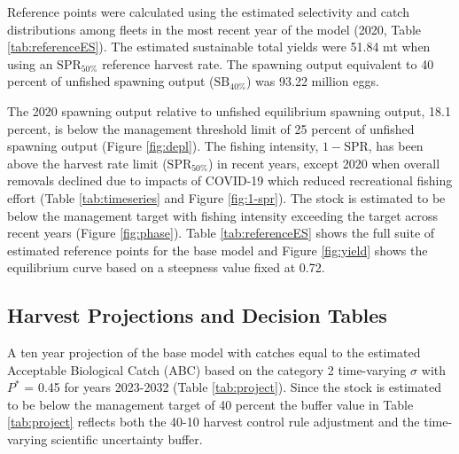 \documentclass[11pt,
  english,
  a4paper,
]{article}
\begin{document}
Reference points were calculated using the estimated selectivity and catch distributions among fleets in the most recent year of the model (2020, Table \ref{tab:referenceES}). The estimated sustainable total yields were 51.84 mt when using an {\(\text{SPR}_{50\%}\)\leavevmode\tagmcend\tagstructend} reference harvest rate. The spawning output equivalent to 40 percent of unfished spawning output ({\(\text{SB}_{40\%}\)\leavevmode\tagmcend\tagstructend}) was 93.22 million eggs.

\leavevmode\tagmcend\tagstructend\par


The 2020 spawning output relative to unfished equilibrium spawning output, 18.1 percent, is below the management threshold limit of 25 percent of unfished spawning output (Figure \ref{fig:depl}). The fishing intensity, {\(1-\text{SPR}\)\leavevmode\tagmcend\tagstructend}, has been above the harvest rate limit ({\(\text{SPR}_{50\%}\)\leavevmode\tagmcend\tagstructend}) in recent years, except 2020 when overall removals declined due to impacts of COVID-19 which reduced recreational fishing effort (Table \ref{tab:timeseries} and Figure \ref{fig:1-spr}). The stock is estimated to be below the management target with fishing intensity exceeding the target across recent years (Figure \ref{fig:phase}). Table \ref{tab:referenceES} shows the full suite of estimated reference points for the base model and Figure \ref{fig:yield} shows the equilibrium curve based on a steepness value fixed at 0.72.

\leavevmode\tagmcend\tagstructend\par


\hypertarget{harvest-projections-and-decision-tables}{%
\subsection{Harvest Projections and Decision Tables}\label{harvest-projections-and-decision-tables}}

\leavevmode\tagmcend\tagstructend


A ten year projection of the base model with catches equal to the estimated Acceptable Biological Catch (ABC) based on the category 2 time-varying {\(\sigma\)\leavevmode\tagmcend\tagstructend} with {\(P^*\)\leavevmode\tagmcend\tagstructend} = 0.45 for years 2023-2032 (Table \ref{tab:project}). Since the stock is estimated to be below the management target of 40 percent the buffer value in Table \ref{tab:project} reflects both the 40-10 harvest control rule adjustment and the time-varying scientific uncertainty buffer.
\end{document}
